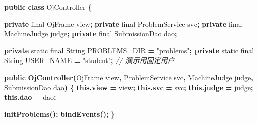 \documentclass[
  11pt,
]{ctexart}
\newenvironment{Shaded}{\begin{snugshade}}{\end{snugshade}}
\newcommand{\BuiltInTok}[1]{#1}
\newcommand{\CommentTok}[1]{\textcolor[rgb]{0.56,0.35,0.01}{\textit{#1}}}
\newcommand{\DataTypeTok}[1]{\textcolor[rgb]{0.13,0.29,0.53}{#1}}
\newcommand{\FunctionTok}[1]{\textcolor[rgb]{0.13,0.29,0.53}{\textbf{#1}}}
\newcommand{\KeywordTok}[1]{\textcolor[rgb]{0.13,0.29,0.53}{\textbf{#1}}}
\newcommand{\NormalTok}[1]{#1}
\newcommand{\OperatorTok}[1]{\textcolor[rgb]{0.81,0.36,0.00}{\textbf{#1}}}
\newcommand{\StringTok}[1]{\textcolor[rgb]{0.31,0.60,0.02}{#1}}
\begin{document}
\begin{Shaded}
\begin{Highlighting}[]
\KeywordTok{public} \KeywordTok{class}\NormalTok{ OjController }\OperatorTok{\{}

    \KeywordTok{private} \DataTypeTok{final}\NormalTok{ OjFrame view}\OperatorTok{;}
    \KeywordTok{private} \DataTypeTok{final}\NormalTok{ ProblemService svc}\OperatorTok{;}
    \KeywordTok{private} \DataTypeTok{final}\NormalTok{ MachineJudge judge}\OperatorTok{;}
    \KeywordTok{private} \DataTypeTok{final}\NormalTok{ SubmissionDao dao}\OperatorTok{;}

    \KeywordTok{private} \DataTypeTok{static} \DataTypeTok{final} \BuiltInTok{String}\NormalTok{ PROBLEMS\_DIR }\OperatorTok{=} \StringTok{"problems"}\OperatorTok{;}
    \KeywordTok{private} \DataTypeTok{static} \DataTypeTok{final} \BuiltInTok{String}\NormalTok{ USER\_NAME    }\OperatorTok{=} \StringTok{"student"}\OperatorTok{;}   \CommentTok{// 演示用固定用户}

    \KeywordTok{public} \FunctionTok{OjController}\OperatorTok{(}\NormalTok{OjFrame view}\OperatorTok{,}
\NormalTok{                        ProblemService svc}\OperatorTok{,}
\NormalTok{                        MachineJudge judge}\OperatorTok{,}
\NormalTok{                        SubmissionDao dao}\OperatorTok{)} \OperatorTok{\{}
        \KeywordTok{this}\OperatorTok{.}\FunctionTok{view}  \OperatorTok{=}\NormalTok{ view}\OperatorTok{;}
        \KeywordTok{this}\OperatorTok{.}\FunctionTok{svc}   \OperatorTok{=}\NormalTok{ svc}\OperatorTok{;}
        \KeywordTok{this}\OperatorTok{.}\FunctionTok{judge} \OperatorTok{=}\NormalTok{ judge}\OperatorTok{;}
        \KeywordTok{this}\OperatorTok{.}\FunctionTok{dao}   \OperatorTok{=}\NormalTok{ dao}\OperatorTok{;}

        \FunctionTok{initProblems}\OperatorTok{();}
        \FunctionTok{bindEvents}\OperatorTok{();}
    \OperatorTok{\}}


\end{Highlighting}
\end{Shaded}
\end{document}
